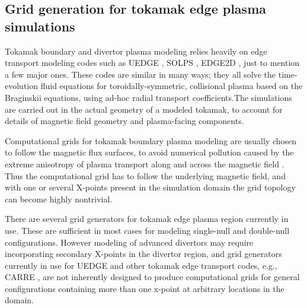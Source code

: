 \subsection{Grid generation for tokamak edge plasma simulations}

Tokamak boundary and divertor plasma modeling relies heavily on edge
transport modeling codes such as UEDGE \cite{Rognlien1999}, SOLPS
\cite{Wiesen2015}, EDGE2D \cite{Simonini1994}, just to mention a few
major ones. These codes are similar in many ways; they all solve the
time-evolution fluid equations for toroidally-symmetric, collisional
plasma based on the Braginskii equations, using ad-hoc radial
transport coefficients.The simulations are carried out in the actual
geometry of a modeled tokamak, to account for details of magnetic
field geometry and plasma-facing components.


Computational grids for tokamak boundary plasma modeling are usually
chosen to follow the magnetic flux surfaces, to avoid numerical
pollution caused by the extreme anisotropy of plasma transport along
and across the magnetic field \cite{Umansky2005}. Thus the
computational grid has to follow the underlying magnetic field, and
with one or several X-points present in the simulation domain the grid
topology can become highly nontrivial.

There are several grid generators for tokamak edge plasma region
currently in use. These are sufficient in most cases for modeling
single-null and double-null configurations. However modeling of
advanced divertors may require incorporating secondary X-points in the
divertor region, and grid generators currently in use for UEDGE and
other tokamak edge transport codes, e.g., CARRE \cite{Marchand1996},
are not inherently designed to produce computational grids for general
configurations containing more than one x-point at arbitrary locations
in the domain.\\ \indent


